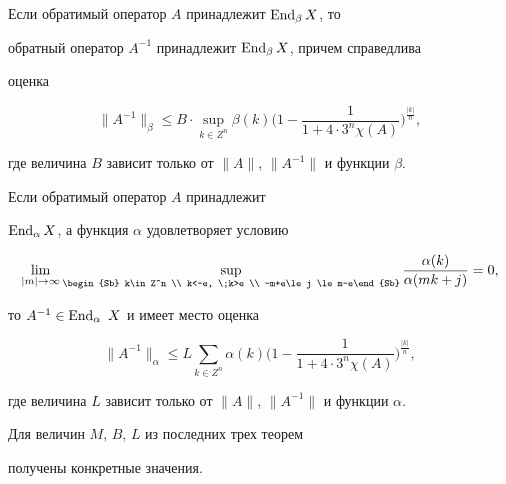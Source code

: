 \begin{thm} Если обратимый оператор $A$ принадлежит $\operatorname{End}_\beta X$, то


обратный оператор $A^{-1}$ принадлежит $\operatorname{End}_\beta X$, причем справедлива


оценка


$$


\|A^{-1}\|_\beta\le B\cdot \sup\limits_{k\in Z^n}


\beta (k)\biggl(1-\frac{1}{1+4\cdot 3^n\chi(A)}\biggr)^{\frac{|k|}{n}},


$$


где величина $B$ зависит только от $\|A\|$, $\|A^{-1}\|$ и функции $\beta$.


\end{thm}





\begin{thm} Если обратимый оператор $A$ принадлежит


$\operatorname{End}_\alpha X$, а функция $\alpha$ удовлетворяет условию


$$


\lim\limits_{|m|\to \infty }


\sup_{\begin{Sb} k\in Z^n \\ k<-e, \;k>e \\


-m+e\le j \le m-e\end{Sb}}


\frac {\alpha (k)}{\alpha (mk+j)}=0,


$$


то $A^{-1} \in \operatorname{End}_\alpha \ X$ и имеет место оценка


$$


\|A^{-1}\|_\alpha\le L \sum_{k\in Z^n}


\alpha (k)\biggl(1-\frac{1}{1+4\cdot 3^n \chi(A)}\biggr)^{\frac {|k|}{n}},


$$


где величина $L$ зависит только от $\|A\|$, $\|A^{-1}\|$ и функции $\alpha$.


\end{thm}





Для величин $M$, $B$, $L$ из последних трех теорем


получены конкретные значения.





